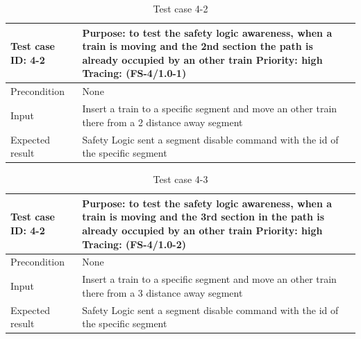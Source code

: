 \begin{table}[H]
	\caption{Test case 4-2}
	\label{table:TCase-FS4-2}
	\begin{center}
		\renewcommand{\arraystretch}{1.8}
		\begin{tabu} 
			to 0.9 \textwidth
			{  X[0.4, c] X[c] }
			\toprule
			Test case ID: 4-2 & Purpose: to test the safety logic awareness, when a train is moving and the 2nd section the path is already occupied by an other train \newline Priority: high \newline Tracing: (FS-4/1.0-1) \\ \midrule
			Precondition      & None                                                                                                                                                                                             \\
			Input             & Insert a train to a specific segment and move an other train there from a 2 distance away segment                                                                                                \\
			Expected result   & Safety Logic sent a segment disable command with the id of the specific segment                                                                                                                  \\ \bottomrule
		\end{tabu}
	\end{center}
\end{table} 

\begin{table}[H]
	\caption{Test case 4-3}
	\label{table:TCase-FS4-3}
	\begin{center}
		\renewcommand{\arraystretch}{1.8}
		\begin{tabu} 
			to 0.9 \textwidth
			{  X[0.4, c] X[c] }
			\toprule
			Test case ID: 4-2 & Purpose: to test the safety logic awareness, when a train is moving and the 3rd section in the path is already occupied by an other train \newline Priority: high \newline Tracing: (FS-4/1.0-2) \\ \midrule
			Precondition      & None                                                                                                                                                                                             \\
			Input             & Insert a train to a specific segment and move an other train there from a 3 distance away segment                                                                                                \\
			Expected result   & Safety Logic sent a segment disable command with the id of the specific segment                                                                                                                  \\ \bottomrule
		\end{tabu}
	\end{center}
\end{table} 

